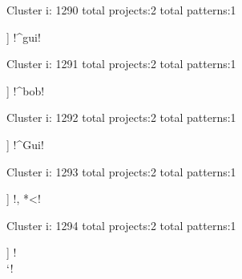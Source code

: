 Cluster i: 1290
total projects:2
total patterns:1
\begin{multicols}{1}
\begin{description}[noitemsep,topsep=0pt]
\item [[2] ] \cverb!^gui!
\end{description}
\end{multicols}







Cluster i: 1291
total projects:2
total patterns:1
\begin{multicols}{1}
\begin{description}[noitemsep,topsep=0pt]
\item [[2] ] \cverb!^bob!
\end{description}
\end{multicols}







Cluster i: 1292
total projects:2
total patterns:1
\begin{multicols}{1}
\begin{description}[noitemsep,topsep=0pt]
\item [[2] ] \cverb!^Gui!
\end{description}
\end{multicols}







Cluster i: 1293
total projects:2
total patterns:1
\begin{multicols}{1}
\begin{description}[noitemsep,topsep=0pt]
\item [[2] ] \cverb!, *<!
\end{description}
\end{multicols}







Cluster i: 1294
total projects:2
total patterns:1
\begin{multicols}{1}
\begin{description}[noitemsep,topsep=0pt]
\item [[2] ] \cverb!\\`!
\end{description}
\end{multicols}







